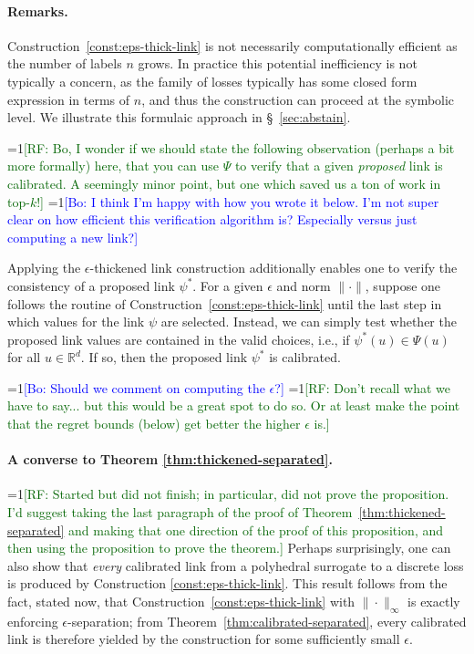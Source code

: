 \documentclass[11pt]{article}
\newcommand{\Comments}{1}
\newcommand{\mynote}[2]{\ifnum\Comments=1\textcolor{#1}{#2}\fi}
\newcommand{\raf}[1]{\mynote{darkgreen}{[RF: #1]}}
\newcommand{\proposedadd}[1]{\mynote{orange}{#1}}
\newcommand{\bo}[1]{\mynote{blue}{[Bo: #1]}}
\newcommand{\reals}{\mathbb{R}}
\begin{document}
\paragraph{Remarks.}
Construction~\ref{const:eps-thick-link} is not necessarily computationally efficient as the number of labels $n$ grows.
In practice this potential inefficiency is not typically a concern, as the family of losses typically has some closed form expression in terms of $n$, and thus the construction can proceed at the symbolic level.
We illustrate this formulaic approach in \S~\ref{sec:abstain}.

\raf{Bo, I wonder if we should state the following observation (perhaps a bit more formally) here, that you can use $\Psi$ to verify that a given \emph{proposed} link is calibrated.  A seemingly minor point, but one which saved us a ton of work in top-$k$!}
\bo{I think I'm happy with how you wrote it below. I'm not super clear on how efficient this verification algorithm is? Especially versus just computing a new link?}

Applying the $\epsilon$-thickened link construction additionally enables one to verify the consistency of a proposed link $\psi^*$.
For a given $\epsilon$ and norm $\|\cdot\|$, suppose one follows the routine of Construction~\ref{const:eps-thick-link} until the last step in which values for the link $\psi$ are selected.
Instead, we can simply test whether the proposed link values are contained in the valid choices, i.e., if $\psi^*(u) \in \Psi(u)$ for all $u\in\reals^d$.
If so, then the proposed link $\psi^*$ is calibrated.


\bo{Should we comment on computing the $\epsilon$?}
\raf{Don't recall what we have to say... but this would be a great spot to do so.  Or at least make the point that the regret bounds (below) get better the higher $\epsilon$ is.}

\paragraph{A converse to Theorem \ref{thm:thickened-separated}.}
\raf{Started but did not finish; in particular, did not prove the proposition.  I'd suggest taking the last paragraph of the proof of Theorem~\ref{thm:thickened-separated} and making that one direction of the proof of this proposition, and then using the proposition to prove the theorem.}
Perhaps surprisingly, one can also show that \emph{every} calibrated link from a polyhedral surrogate to a discrete loss is produced by Construction \ref{const:eps-thick-link}.
This result follows from the fact, stated now, that Construction~\ref{const:eps-thick-link} with $\|\cdot\|_\infty$ is exactly enforcing $\epsilon$-separation; from Theorem~\ref{thm:calibrated-separated}, every calibrated link is therefore yielded by the construction for some sufficiently small $\epsilon$.
\end{document}
